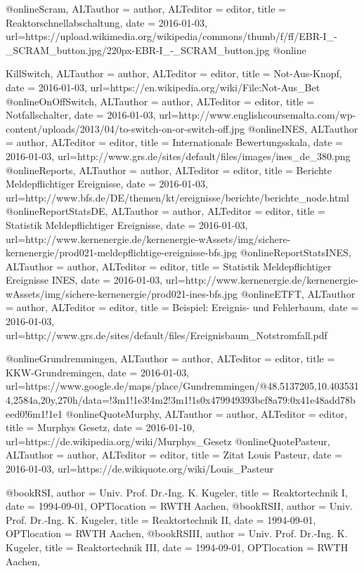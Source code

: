 @online{Scram,
	ALTauthor = {author},
	ALTeditor = {editor},
	title = {Reaktorschnellabschaltung},
	date = {2016-01-03},
	url={https://upload.wikimedia.org/wikipedia/commons/thumb/f/ff/EBR-I_-_SCRAM_button.jpg/220px-EBR-I_-_SCRAM_button.jpg}
}
@online{KillSwitch,
	ALTauthor = {author},
	ALTeditor = {editor},
	title = {Not-Aus-Knopf},
	date = {2016-01-03},
	url={https://en.wikipedia.org/wiki/File:Not-Aus_Bet%
}
@online{OnOffSwitch,
	ALTauthor = {author},
	ALTeditor = {editor},
	title = {Notfallschalter},
	date = {2016-01-03},
	url={http://www.englishcoursemalta.com/wp-content/uploads/2013/04/to-switch-on-or-switch-off.jpg}
}
@online{INES,
	ALTauthor = {author},
	ALTeditor = {editor},
	title = {Internationale Bewertungsskala},
	date = {2016-01-03},
	url={http://www.grs.de/sites/default/files/images/ines_de_380.png}
}
@online{Reports,
	ALTauthor = {author},
	ALTeditor = {editor},
	title = {Berichte Meldepflichtiger Ereignisse},
	date = {2016-01-03},
	url={http://www.bfs.de/DE/themen/kt/ereignisse/berichte/berichte_node.html}
}
@online{ReportStatsDE,
	ALTauthor = {author},
	ALTeditor = {editor},
	title = {Statistik Meldepflichtiger Ereignisse},
	date = {2016-01-03},
	url={http://www.kernenergie.de/kernenergie-wAssets/img/sichere-kernenergie/prod021-meldepflichtige-ereignisse-bfs.jpg}
}
@online{ReportStatsINES,
	ALTauthor = {author},
	ALTeditor = {editor},
	title = {Statistik Meldepflichtiger Ereignisse INES},
	date = {2016-01-03},
	url={http://www.kernenergie.de/kernenergie-wAssets/img/sichere-kernenergie/prod021-ines-bfs.jpg}
}
@online{ETFT,
	ALTauthor = {author},
	ALTeditor = {editor},
	title = {Beispiel: Ereignis- und Fehlerbaum},
	date = {2016-01-03},
	url={http://www.grs.de/sites/default/files/Ereignisbaum_Notstromfall.pdf}
}


@online{Grundremmingen,
	ALTauthor = {author},
	ALTeditor = {editor},
	title = {KKW-Grundremingen},
	date = {2016-01-03},
	url={https://www.google.de/maps/place/Gundremmingen/@48.5137205,10.4035314,2584a,20y,270h/data=!3m1!1e3!4m2!3m1!1s0x479949393bcf8a79:0x41e48add78beed0!6m1!1e1}
}
@online{QuoteMurphy,
	ALTauthor = {author},
	ALTeditor = {editor},
	title = {Murphys Gesetz},
	date = {2016-01-10},
	url={https://de.wikipedia.org/wiki/Murphys_Gesetz}
}
@online{QuotePasteur,
	ALTauthor = {author},
	ALTeditor = {editor},
	title = {Zitat Louis Pasteur},
	date = {2016-01-03},
	url={https://de.wikiquote.org/wiki/Louis_Pasteur}
}

@book{RSI,
	author = {Univ. Prof. Dr.-Ing. K. Kugeler},
	title = {Reaktortechnik I},
	date = {1994-09-01},
	OPTlocation = {RWTH Aachen},
}
@book{RSII,
	author = {Univ. Prof. Dr.-Ing. K. Kugeler},
	title = {Reaktortechnik II},
	date = {1994-09-01},
	OPTlocation = {RWTH Aachen},
}
@book{RSIII,
	author = {Univ. Prof. Dr.-Ing. K. Kugeler},
	title = {Reaktortechnik III},
	date = {1994-09-01},
	OPTlocation = {RWTH Aachen},
}



}
